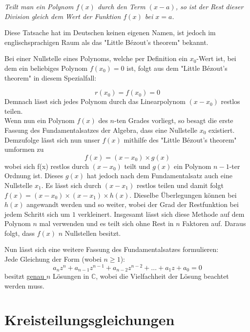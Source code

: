 \documentclass[a4paper,12pt]{article} %
\begin{document}
\noindent \emph{Teilt man ein Polynom $f(x)$ durch den Term $(x-a)$, so ist der Rest dieser Division gleich dem Wert der Funktion $f(x)$ bei $x=a$.}

\noindent Diese Tatsache hat im Deutschen keinen eigenen Namen, ist jedoch im englischsprachigen Raum als das "Little Bézout's theorem" bekannt.

Bei einer Nullstelle eines Polynoms, welche per Definition ein $x_0$-Wert ist, bei dem ein beliebiges Polynom $f(x_0) = 0$ ist, folgt aus dem "Little Bézout's theorem" {in} diesem Spezialfall:

\begin{equation}\label{eq:bezout0}
r(x_0) = f(x_0)=0
\end{equation}
Demnach lässt sich jedes Polynom durch das Linearpolynom $(x-x_0)$ restlos teilen.\\

Wenn nun ein Polynom $f(x)$ des $n$-ten Grades vorliegt, so besagt die erste Fassung des Fundamentalsatzes der Algebra, dass eine Nullstelle $x_0$ existiert. Demzufolge lässt sich nun unser $f(x)$ mithilfe des "Little Bézout's theorem" {}umformen zu
\[f(x)=(x-x_0) \times g(x)\]
wobei sich f(x) restlos durch $(x-x_0)$ teilt und $g(x)$ ein Polynom $n-1$-ter Ordnung ist.
Dieses $g(x)$ hat jedoch nach dem Fundamentalsatz auch eine Nullstelle $x_1$.
Es lässt sich durch $(x-x_1)$ restlos teilen und damit folgt $f(x) = (x-x_0) \times (x-x_1) \times h(x)$.
Dieselbe Überlegungen können bei $h(x)$ angewandt werden und so weiter, wobei der Grad der Restfunktion bei jedem Schritt sich um $1$ verkleinert.
Insgesamt lässt sich diese Methode auf dem Polynom $n$ mal verwenden und es teilt sich ohne Rest in $n$ Faktoren auf. Daraus folgt, dass $f(x)$ $n$ Nullstellen besitzt.

Nun lässt sich eine weitere Fassung des Fundamentalsatzes formulieren:\\

\noindent Jede Gleichung der Form (wobei $n \geq 1$):
\begin{equation}\label{eq:funda2}
	\boxed{	a_nz^n + a_{n-1}z^{n-1} + a_{n-2}z^{n-2} + \dots + a_1z + a_0 = 0
	}
\end{equation}
besitzt \underline{genau $n$} Lösungen in $\mathbb{C}$, wobei die Vielfachheit der Lösung beachtet werden muss.





\section{Kreisteilungsgleichungen}
\end{document}
